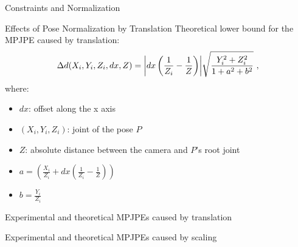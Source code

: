 \documentclass[8pt]{beamer}
\begin{document}
\begin{frame}[t]{Constraints and Normalization}
\begin{figure}
{\begin{subfigure}{.45\textwidth}
{
			}
			\end{subfigure}
		}
		\hspace{.5cm}
		\end{figure}
		\vfill

	\end{frame}

	\begin{frame}{Effects of Pose Normalization by Translation}
	Theoretical lower bound for the MPJPE caused by translation:
	\begin{equation*}
		\Delta d(X_i, Y_i, Z_i, dx, Z) = \abs{dx \left (\frac{1}{Z_i} - \frac{1}{Z} \right )} \sqrt{\frac{Y_i^2 + Z_i^2}{1 + a^2 + b^2}} \ , 
	\end{equation*}
	where:
	\begin{itemize}
		\item $dx$: offset along the x axis
		\item $(X_i, Y_i, Z_i)$: joint of the pose $P$
		\item $Z$: absolute distance between the camera and $P$'s root joint
		\item $a = \left( \frac{X_i}{Z_i} + dx \left( \frac{1}{Z_i} - \frac{1}{Z} \right) \right )$
		\item $b = \frac{Y_i}{Z_i}$
	\end{itemize}  
	\end{frame}

	\begin{frame}{Experimental and theoretical MPJPEs caused by translation}
		
	\end{frame}

	\begin{frame}{Experimental and theoretical MPJPEs caused by scaling}
		
	\end{frame}
\end{document}
